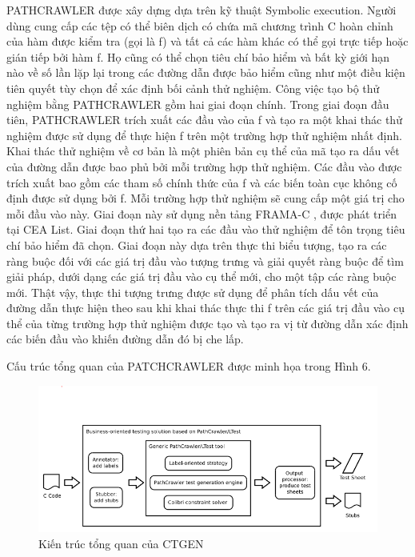 \documentclass[12pt,a4paper]{article}
\begin{document}
\indent PATHCRAWLER được xây dựng dựa trên kỹ thuật Symbolic execution. Người dùng cung cấp các tệp có thể biên dịch có chứa mã chương trình C hoàn chỉnh của hàm được kiểm tra (gọi là f) và tất cả các hàm khác có thể gọi trực tiếp hoặc gián tiếp bởi hàm f. Họ cũng có thể chọn tiêu chí bảo hiểm và bất kỳ giới hạn nào về số lần lặp lại trong các đường dẫn được bảo hiểm cũng như một điều kiện tiên quyết tùy chọn để xác định bối cảnh thử nghiệm. Công việc tạo bộ thử nghiệm bằng PATHCRAWLER gồm hai giai đoạn chính. Trong giai đoạn đầu tiên, PATHCRAWLER trích xuất các đầu vào của f và tạo ra một khai thác thử nghiệm được sử dụng để thực hiện f trên một trường hợp thử nghiệm nhất định. Khai thác thử nghiệm về cơ bản là một phiên bản cụ thể của mã tạo ra dấu vết của đường dẫn được bao phủ bởi mỗi trường hợp thử nghiệm. Các đầu vào được trích xuất bao gồm các tham số chính thức của f và các biến toàn cục không cố định được sử dụng bởi f. Mỗi trường hợp thử nghiệm sẽ cung cấp một giá trị cho mỗi đầu vào này. Giai đoạn này sử dụng nền tảng FRAMA-C \cite{kirchner2015frama}, được phát triển tại CEA List. Giai đoạn thứ hai tạo ra các đầu vào thử nghiệm để tôn trọng tiêu chí bảo hiểm đã chọn.  Giai đoạn này dựa trên thực thi biểu tượng, tạo ra các ràng buộc đối với các giá trị đầu vào tượng trưng và giải quyết ràng buộc để tìm giải pháp, dưới dạng các giá trị đầu vào cụ thể mới, cho một tập các ràng buộc mới. Thật vậy, thực thi tượng trưng được sử dụng để phân tích dấu vết của đường dẫn thực hiện theo sau khi khai thác thực thi f trên các giá trị đầu vào cụ thể của từng trường hợp thử nghiệm được tạo và tạo ra vị từ đường dẫn xác định các biến đầu vào khiến đường dẫn đó bị che lấp.

\indent Cấu trúc tổng quan của PATCHCRAWLER được minh họa trong Hình 6.
\begin{figure}[ht]
\begin{center}
\includegraphics[scale=.7]{hinhanh/pathcrawler}
\end{center}
\caption{Kiến trúc tổng quan của CTGEN}
\end{figure}
\end{document}
